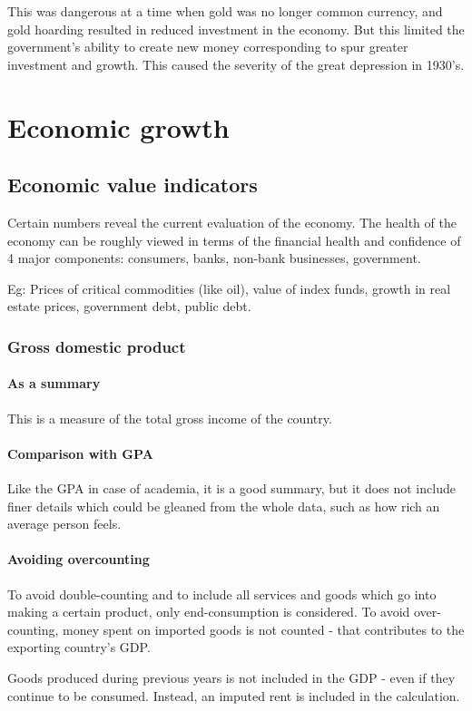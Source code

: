 \documentclass[oneside, article]{memoir}
\begin{document}
This was dangerous at a time when gold was no longer common currency, and gold hoarding resulted in reduced investment in the economy. But this limited the government's ability to create new money corresponding to spur greater investment and growth. This caused the severity of the great depression in 1930's.

\chapter{Economic growth}
\section{Economic value indicators}
Certain numbers reveal the current evaluation of the economy. The health of the economy can be roughly viewed in terms of the financial health and confidence of 4 major components: consumers, banks, non-bank businesses, government.

Eg: Prices of critical commodities (like oil), value of index funds, growth in real estate prices, government debt, public debt.

\subsection{Gross domestic product}
\subsubsection{As a summary}
This is a measure of the total gross income of the country.

\subsubsection{Comparison with GPA}
Like the GPA in case of academia, it is a good summary, but it does not include finer details which could be gleaned from the whole data, such as how rich an average person feels.

\subsubsection{Avoiding overcounting}
To avoid double-counting and to include all services and goods which go into making a certain product, only end-consumption is considered. To avoid over-counting, money spent on imported goods is not counted - that contributes to the exporting country's GDP.

Goods produced during previous years is not included in the GDP - even if they continue to be consumed. Instead, an imputed rent is included in the calculation.
\end{document}
